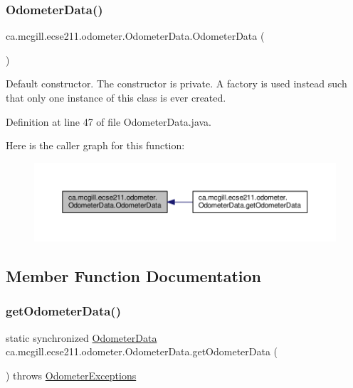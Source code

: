 \subsubsection{\texorpdfstring{Odometer\+Data()}{OdometerData()}}
{\footnotesize\ttfamily ca.\+mcgill.\+ecse211.\+odometer.\+Odometer\+Data.\+Odometer\+Data (\begin{DoxyParamCaption}{ }\end{DoxyParamCaption})\hspace{0.3cm}{\ttfamily [protected]}}

Default constructor. The constructor is private. A factory is used instead such that only one instance of this class is ever created. 

Definition at line 47 of file Odometer\+Data.\+java.

Here is the caller graph for this function\+:\nopagebreak
\begin{figure}[H]
\begin{center}
\leavevmode
\includegraphics[width=350pt]{classca_1_1mcgill_1_1ecse211_1_1odometer_1_1_odometer_data_a91412854b75c41bf3af7c8892ec0fe87_icgraph}
\end{center}
\end{figure}


\subsection{Member Function Documentation}
\mbox{\label{classca_1_1mcgill_1_1ecse211_1_1odometer_1_1_odometer_data_afff2d760dd1f861b580f3eacef37f1cc}} 
\subsubsection{\texorpdfstring{get\+Odometer\+Data()}{getOdometerData()}}
{\footnotesize\ttfamily static synchronized \hyperlink{classca_1_1mcgill_1_1ecse211_1_1odometer_1_1_odometer_data}{Odometer\+Data} ca.\+mcgill.\+ecse211.\+odometer.\+Odometer\+Data.\+get\+Odometer\+Data (\begin{DoxyParamCaption}{ }\end{DoxyParamCaption}) throws \hyperlink{classca_1_1mcgill_1_1ecse211_1_1odometer_1_1_odometer_exceptions}{Odometer\+Exceptions}\hspace{0.3cm}{\ttfamily [static]}}

